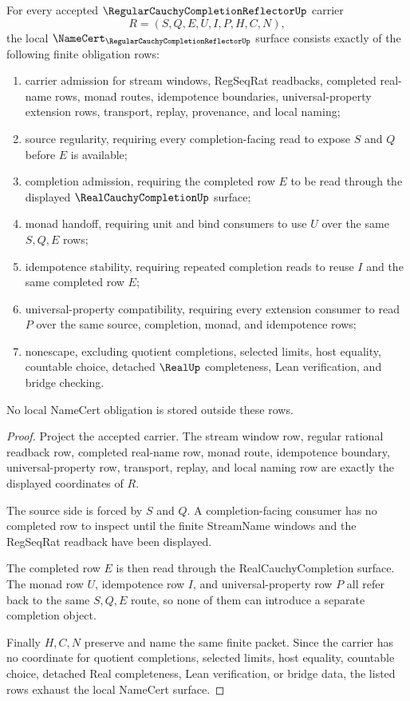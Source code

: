 \begin{theorem}
\label{thm:regular-cauchy-completion-reflector-namecert-obligations}
For every accepted $\RegularCauchyCompletionReflectorUp$ carrier
$$
R=(S,Q,E,U,I,P,H,C,N),
$$
the local $\NameCert_{\RegularCauchyCompletionReflectorUp}$ surface consists exactly of the following finite obligation rows:
\begin{enumerate}
\item carrier admission for stream windows, RegSeqRat readbacks, completed real-name rows, monad routes, idempotence boundaries, universal-property extension rows, transport, replay, provenance, and local naming;
\item source regularity, requiring every completion-facing read to expose $S$ and $Q$ before $E$ is available;
\item completion admission, requiring the completed row $E$ to be read through the displayed $\RealCauchyCompletionUp$ surface;
\item monad handoff, requiring unit and bind consumers to use $U$ over the same $S,Q,E$ rows;
\item idempotence stability, requiring repeated completion reads to reuse $I$ and the same completed row $E$;
\item universal-property compatibility, requiring every extension consumer to read $P$ over the same source, completion, monad, and idempotence rows;
\item nonescape, excluding quotient completions, selected limits, host equality, countable choice, detached $\RealUp$ completeness, Lean verification, and bridge checking.
\end{enumerate}
No local NameCert obligation is stored outside these rows.
\end{theorem}
\begin{proof}
Project the accepted carrier. The stream window row, regular rational readback row, completed real-name row, monad route, idempotence boundary, universal-property row, transport, replay, and local naming row are exactly the displayed coordinates of $R$.

The source side is forced by $S$ and $Q$. A completion-facing consumer has no completed row to inspect until the finite StreamName windows and the RegSeqRat readback have been displayed.

The completed row $E$ is then read through the RealCauchyCompletion surface. The monad row $U$, idempotence row $I$, and universal-property row $P$ all refer back to the same $S,Q,E$ route, so none of them can introduce a separate completion object.

Finally $H,C,N$ preserve and name the same finite packet. Since the carrier has no coordinate for quotient completions, selected limits, host equality, countable choice, detached Real completeness, Lean verification, or bridge data, the listed rows exhaust the local NameCert surface.
\end{proof}

